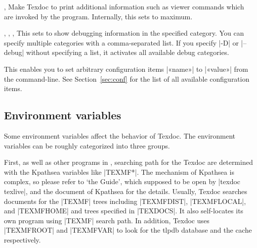 \documentclass{texdoc-doc}
\begin{document}
\begin{clopt}{, }
Make Texdoc to print additional information such as viewer commands which are
invoked by the program. Internally, this sets  to maximum.
\end{clopt}

\begin{clopt}{%
  , ,
  , }
This sets  to show debugging information in the specified
category. You can specify multiple categories with a comma-separated list. If
you specify |-D| or |--debug| without specifying a list, it activates all
available debug categories.
\end{clopt}

\begin{clopt}{}
This enables you to set arbitrary configuration items |«name»| to |«value»|
from the command-line. See Section~\ref{sec:conf} for the list of all available
configuration items.
\end{clopt}

\subsection{Environment variables}
\label{sec:envvar}

Some environment variables affect the behavior of Texdoc. The environment
variables can be roughly categorized into three groups.

First, as well as other programs in {\TL}, searching path for the Texdoc are
determined with the Kpathsea variables like |TEXMF*|. The mechanism of Kpathsea
is complex, so please refer to `the {\TL} Guide', which supposed to be open by
|texdoc texlive|, and the document of Kpathsea for the details. Usually, Texdoc
searches documents for the |TEXMF| trees including |TEXMFDIST|, |TEXMFLOCAL|,
and |TEXMFHOME| and trees specified in |TEXDOCS|. It also self-locates its own
program using |TEXMF| search path. In addition, Texdoc uses |TEXMFROOT| and
|TEXMFVAR| to look for the tlpdb database and the cache respectively.
\end{document}
